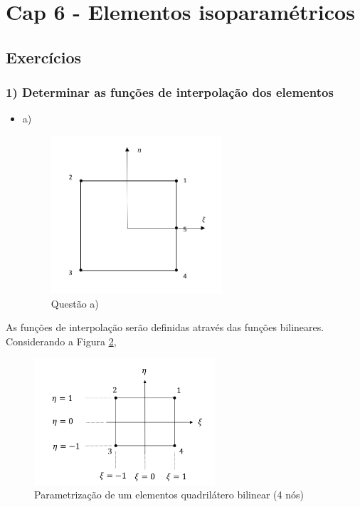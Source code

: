 \section{Cap 6 - Elementos isoparamétricos}

\subsection{Exercícios}

\subsubsection{1) Determinar as funções de interpolação dos elementos}
%
\begin{itemize}
	\item a)
	\begin{figure}[H]
	\includegraphics[width=0.6\textwidth,center]{fig/cap6_1_a.PNG}
	\caption{Questão a)} 
	\label{cap6:cap6_1_a}
	\end{figure}
%
\end{itemize}
%
As funções de interpolação serão definidas através das funções bilineares. Considerando a Figura \ref{cap6:quad_bilinear_0}, 
%
\begin{figure}[H]
	\includegraphics[width=0.6\textwidth,center]{fig/quadrilatero_4_livro.PNG}
	\caption{Parametrização de um elementos quadrilátero bilinear (4 nós)} 
	\label{cap6:quad_bilinear_0}
\end{figure}
